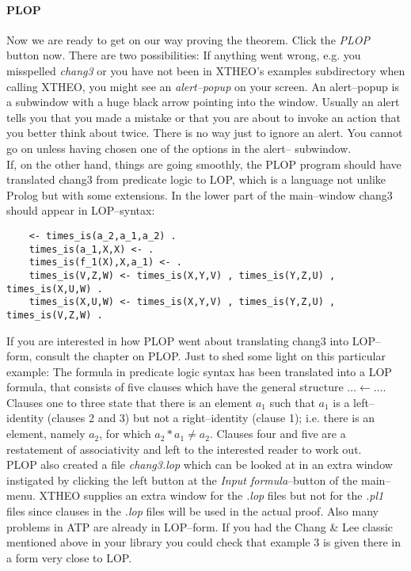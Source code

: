 \paragraph{PLOP}
Now we are ready to get on our way proving the theorem. Click the {\it PLOP\/} button now.
There are two possibilities:
If anything went wrong, e.g. you misspelled {\it chang3\/} or you have not been in XTHEO's examples
subdirectory when calling XTHEO, you might see an {\it alert--popup\/} on your screen. An alert--popup
is a subwindow with a huge black arrow pointing into the window. Usually an
alert tells you that you made a mistake or that you are about to invoke an action that you better think
about twice. There is no way just to ignore an alert. You cannot go on unless having chosen one of the
options in the alert-- subwindow. \\
If, on the other hand, things are going smoothly, the PLOP program should have translated chang3 from
predicate logic to LOP, which is a language not unlike Prolog but with some extensions.
In the lower part of the main--window chang3 should appear in LOP--syntax:
\begin{center}
\begin{verbatim}
    <- times_is(a_2,a_1,a_2) . 
    times_is(a_1,X,X) <- . 
    times_is(f_1(X),X,a_1) <- . 
    times_is(V,Z,W) <- times_is(X,Y,V) , times_is(Y,Z,U) , times_is(X,U,W) . 
    times_is(X,U,W) <- times_is(X,Y,V) , times_is(Y,Z,U) , times_is(V,Z,W) . 
\end{verbatim}
\end{center}
If you are interested in how PLOP went about translating chang3 into LOP--form, consult the chapter on PLOP.
Just to shed some light on this particular example:
The formula in predicate logic syntax has been translated into a LOP formula, that consists of
five clauses which have the general structure $\ldots \leftarrow \ldots .$
Clauses one to three state that there is an element $a_1$ such that $a_1$ is a left--identity (clauses 2 and 3)
but not a right--identity (clause 1); i.e. there is an element, namely $a_2$, for which $a_2 * a_1 \neq a_2$.
Clauses four and five are a restatement of associativity and left to the interested reader to work out.
\\
PLOP also created a file {\it chang3.lop\/} which can be looked at in an extra window instigated by
clicking the left button at the {\it Input formula\/}--button of the main--menu.
XTHEO supplies an extra window for the {\it .lop\/} files but not for the {\it .pl1\/} files since
clauses in the {\it .lop\/} files will be used in the actual proof. Also
many problems in ATP are already in LOP--form. If you had the Chang \& Lee classic mentioned above in your library
you could check that example 3 is given there in a form very close to LOP.
